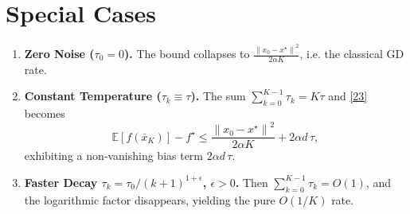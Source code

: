 \documentclass{article}
\newcommand{\EE}{\mathbb{E}}
\newcommand{\norm}[1]{\left\|#1\right\|}
\begin{document}
\section*{Special Cases}
\begin{enumerate}[label=\alph*.]
\item \textbf{Zero Noise ($\tau_0=0$).}  The bound collapses to $\frac{\norm{x_0-x^\star}^2}{2\alpha K}$, i.e. the classical GD rate.
\item \textbf{Constant Temperature ($\tau_k\equiv\tau$).}  The sum $\sum_{k=0}^{K-1}\tau_k = K\tau$ and \eqref{23} becomes 
\[
\EE[f(\bar x_K)]-f^\star\le \frac{\norm{x_0-x^\star}^2}{2\alpha K}+2\alpha d\,\tau,
\]
exhibiting a non‑vanishing bias term $2\alpha d\,\tau$.
\item \textbf{Faster Decay $\tau_k=\tau_0/(k+1)^{1+\epsilon}$, $\epsilon>0$.}  
Then $\sum_{k=0}^{K-1}\tau_k = O(1)$, and the logarithmic factor disappears, yielding the pure $O(1/K)$ rate.
\end{enumerate}
\end{document}
